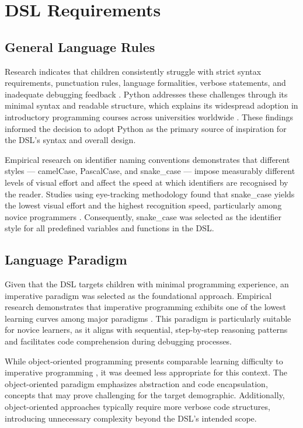 \section{DSL Requirements}

\subsection{General Language Rules}

Research indicates that children consistently struggle with strict syntax requirements, punctuation rules, language formalities, verbose statements, and inadequate debugging feedback \cite{klimekova_is_2015}.
Python addresses these challenges through its minimal syntax and readable structure, which explains its widespread adoption in introductory programming courses across universities worldwide \cite{klimekova_is_2015}.
These findings informed the decision to adopt Python as the primary source of inspiration for the DSL's syntax and overall design.

Empirical research on identifier naming conventions demonstrates that different styles --- camelCase, PascalCase, and snake\_case --- impose measurably different levels of visual effort and affect the speed at which identifiers are recognised by the reader. 
Studies using eye-tracking methodology found that snake\_case yields the lowest visual effort and the highest recognition speed, particularly among novice programmers \cite{sharif_eye_2010}. 
Consequently, snake\_case was selected as the identifier style for all predefined variables and functions in the DSL.

\subsection{Language Paradigm}

Given that the DSL targets children with minimal programming experience, an imperative paradigm was selected as the foundational approach. 
Empirical research demonstrates that imperative programming exhibits one of the lowest learning curves among major paradigms \cite{ugwumba_programming_2026}. 
This paradigm is particularly suitable for novice learners, as it aligns with sequential, step-by-step reasoning patterns and facilitates code comprehension during debugging processes.

While object-oriented programming presents comparable learning difficulty to imperative programming \cite{ugwumba_programming_2026}, it was deemed less appropriate for this context. 
The object-oriented paradigm emphasizes abstraction and code encapsulation, concepts that may prove challenging for the target demographic. 
Additionally, object-oriented approaches typically require more verbose code structures, introducing unnecessary complexity beyond the DSL's intended scope.


